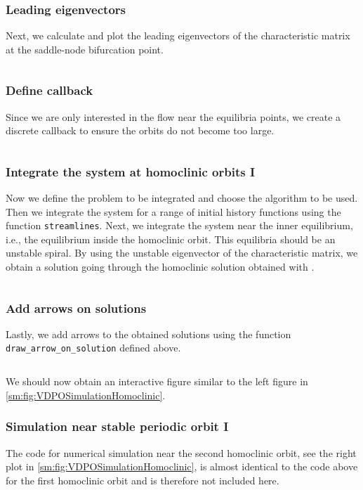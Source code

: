 \subsubsection{Leading eigenvectors}
Next, we calculate and plot the leading eigenvectors of the characteristic matrix at the saddle-node bifurcation point.
\inputminted[firstline=103, lastline=117]{julia}{\pathToJuliaFiles/vdpo_simulation_article.jl}

\subsubsection{Define callback}
Since we are only interested in the flow near the equilibria points, we create a
discrete callback to ensure the orbits do not become too large.
\inputminted[firstline=122, lastline=125]{julia}{\pathToJuliaFiles/vdpo_simulation_article.jl}

\subsubsection{Integrate the system at homoclinic orbits I}
Now we define the problem to be integrated and choose the algorithm to be used.
Then we integrate the system for a range of initial history functions using the
function \texttt{streamlines}. Next, we integrate the system near
the inner equilibrium, i.e., the equilibrium inside the homoclinic orbit. This
equilibria should be an unstable spiral. By using the unstable eigenvector of the
characteristic matrix, we obtain a solution going through the homoclinic solution
obtained with \DDEBIFTOOL.
\inputminted[firstline=127, lastline=152]{julia}{\pathToJuliaFiles/vdpo_simulation_article.jl}

\subsubsection{Add arrows on solutions}
Lastly, we add arrows to the obtained solutions using the function
\texttt{draw_arrow_on_solution} defined above.
\inputminted[firstline=154, lastline=158]{julia}{\pathToJuliaFiles/vdpo_simulation_article.jl}
We should now obtain an interactive figure similar to the left figure in \cref{sm:fig:VDPOSimulationHomoclinic}.

\subsubsection{Simulation near stable periodic orbit I}
The code for numerical simulation near the second homoclinic orbit, see the
right plot in \cref{sm:fig:VDPOSimulationHomoclinic}, is almost identical to
the code above for the first homoclinic orbit and is therefore not included
here.

